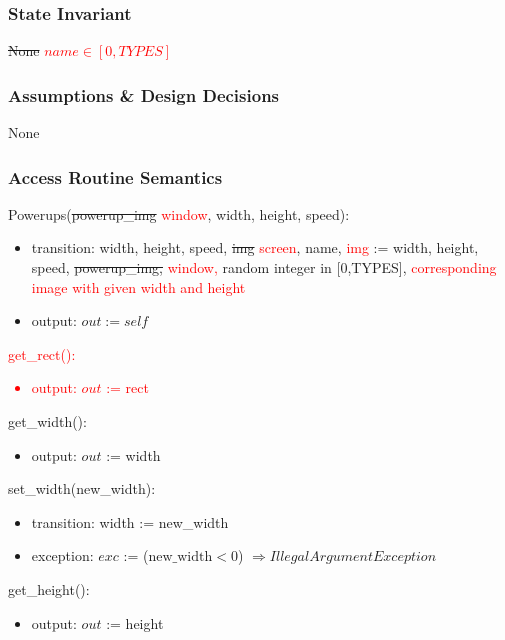 \documentclass[12pt]{article}
\begin{document}
\subsubsection* {State Invariant}

\sout{None} \textcolor{red}{$name \in [0,TYPES]$}

\subsubsection* {Assumptions \& Design Decisions}

None

\subsubsection* {Access Routine Semantics}

\noindent Powerups(\sout{powerup\_img} \textcolor{red}{window}, width, height, speed):
\begin{itemize}
    \item transition: width, height, speed, \sout{img} \textcolor{red}{screen}, name, \textcolor{red}{img} := width, height, speed, \sout{powerup\_img,} \textcolor{red}{window, } random integer in [0,TYPES], \textcolor{red}{corresponding image with given width and height}
    \item output: $out := self$
\end{itemize}

\noindent \textcolor{red}{get\_rect():
\begin{itemize}
    \item output: $out$ := rect
\end{itemize}}

\noindent get\_width():
\begin{itemize}
    \item output: $out$ := width 
\end{itemize}

\noindent set\_width(new\_width):
\begin{itemize}
    \item transition: width := new\_width 
    \item exception: $exc$ := ($\text{new\_width} < 0$) $\Rightarrow  IllegalArgumentException$
\end{itemize}

\noindent get\_height():
\begin{itemize}
    \item output: $out$ := height
\end{itemize}
\end{document}
